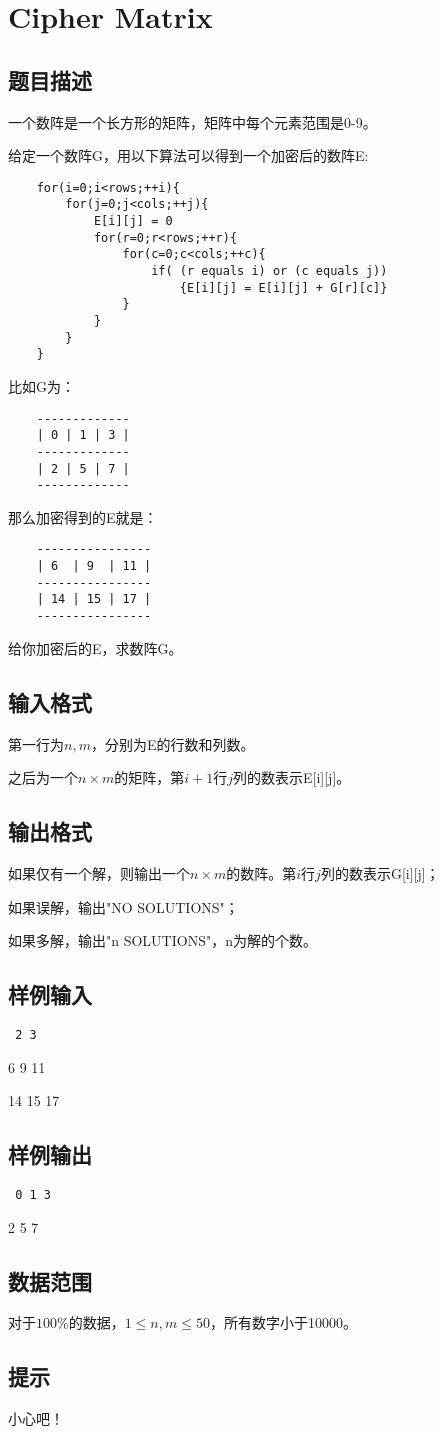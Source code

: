 \section{Cipher Matrix}
\subsection{题目描述} \par
一个数阵是一个长方形的矩阵，矩阵中每个元素范围是0-9。\par
给定一个数阵G，用以下算法可以得到一个加密后的数阵E:\par

\begin{verbatim}
	for(i=0;i<rows;++i){
  		for(j=0;j<cols;++j){
    		E[i][j] = 0
    		for(r=0;r<rows;++r){
      			for(c=0;c<cols;++c){
        			if( (r equals i) or (c equals j))
        				{E[i][j] = E[i][j] + G[r][c]}
      			}
    		}
  		}
	}
\end{verbatim}\par
比如G为： 
\begin{verbatim}
	-------------
	| 0 | 1 | 3 |
	-------------
	| 2 | 5 | 7 |
	-------------
\end{verbatim} \par
那么加密得到的E就是：
\begin{verbatim}
	----------------
	| 6  | 9  | 11 |
	----------------
	| 14 | 15 | 17 |
	----------------
\end{verbatim} \par
给你加密后的E，求数阵G。
\subsection{输入格式} \par
第一行为$n,m$，分别为E的行数和列数。
\par 之后为一个$n \times m$的矩阵，第$i+1$行$j$列的数表示E[i][j]。
\subsection{输出格式}\par
如果仅有一个解，则输出一个$n \times m$的数阵。第$i$行$j$列的数表示G[i][j]；\par
如果误解，输出"NO SOLUTIONS"； \par
如果多解，输出"n SOLUTIONS"，n为解的个数。
\subsection{样例输入}\par
{\tt 
2 3 \par
6 9 11 \par
14 15 17 \par
}
\subsection{样例输出}\par
{\tt 
0 1 3 \par 
2 5 7 \par
}
\subsection{数据范围}
\par 对于$100\%$的数据，$1 \le n,m \le 50$，所有数字小于10000。
\subsection{提示}
\par 小心吧！

